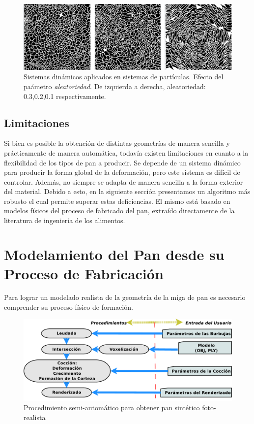 \documentclass[spanish,a4paper,11pt,oneside,links]{report}
\begin{document}
\begin{figure}[htb!]
  \centerline{\includegraphics[scale=0.21]{sistdin3}}
  \caption{Sistemas din\'amicos aplicados en sistemas de part\'iculas. Efecto del pa\'ametro {\em aleatoriedad}. De izquierda a derecha, aleatoriedad: 0.3,0.2,0.1 respectivamente. }
  \label{fg:sistdin3}
\end{figure}

\subsection{Limitaciones}
Si bien es posible la obtención de distintas geometrías de manera sencilla y prácticamente de manera automática, todavía existen limitaciones en cuanto a la flexibilidad de los tipos de pan a producir.
Se depende de un sistema dinámico para producir la forma global de la deformación, pero este sistema es difícil de controlar.
Además, no siempre se adapta de manera sencilla a la forma exterior del material.
Debido a esto, en la siguiente sección presentamos un algoritmo más robusto el cual permite superar estas deficiencias.
El mismo está basado en modelos físicos del proceso de fabricado del pan, extraído directamente de la literatura de ingeniería de los alimentos.

\section{Modelamiento del Pan desde su Proceso de Fabricación}
Para lograr un modelado realista de la geometría de la miga de pan es necesario comprender su proceso físico de formación.

\begin{figure}
\includegraphics[width=15cm]{figures/pipeline}
\caption{Procedimiento semi-automático para obtener pan sintético foto-realista}
\label{FigPipeline}
\end{figure}
\end{document}
